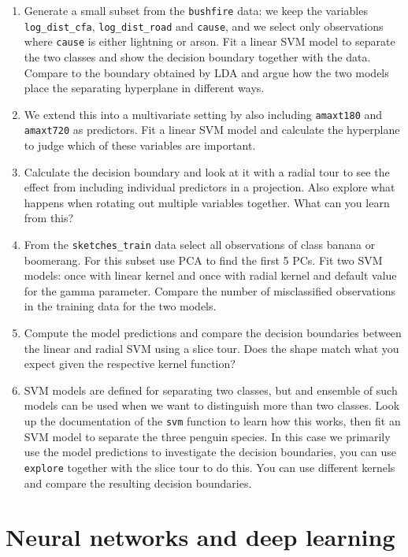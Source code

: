 \documentclass[
  letterpaper,
]{krantz}
\providecommand{\tightlist}{%
  \setlength{\itemsep}{0pt}\setlength{\parskip}{0pt}}
\begin{document}
\begin{enumerate}
\def\labelenumi{\arabic{enumi}.}
\tightlist
\item
  Generate a small subset from the \texttt{bushfire} data: we keep the
  variables \texttt{log\_dist\_cfa}, \texttt{log\_dist\_road} and
  \texttt{cause}, and we select only observations where \texttt{cause}
  is either lightning or arson. Fit a linear SVM model to separate the
  two classes and show the decision boundary together with the data.
  Compare to the boundary obtained by LDA and argue how the two models
  place the separating hyperplane in different
  ways.
\item
  We extend this into a multivariate setting by also including
  \texttt{amaxt180} and \texttt{amaxt720} as predictors. Fit a linear
  SVM model and calculate the hyperplane to judge which of these
  variables are important.
\item
  Calculate the decision boundary and look at it with a radial tour to
  see the effect from including individual predictors in a projection.
  Also explore what happens when rotating out multiple variables
  together. What can you learn from this?
\item
  From the \texttt{sketches\_train} data select all observations of
  class banana or boomerang. For this subset use PCA to find the first 5
  PCs. Fit two SVM models: once with linear kernel and once with radial
  kernel and default value for the gamma parameter. Compare the number
  of misclassified observations in the training data for the two
  models.
\item
  Compute the model predictions and compare the decision boundaries
  between the linear and radial SVM using a slice tour. Does the shape
  match what you expect given the respective kernel function?
\item
  SVM models are defined for separating two classes, but and ensemble of
  such models can be used when we want to distinguish more than two
  classes. Look up the documentation of the \texttt{svm} function to
  learn how this works, then fit an SVM model to separate the three
  penguin species. In this case we primarily use the model predictions
  to investigate the decision boundaries, you can use \texttt{explore}
  together with the slice tour to do this. You can use different kernels
  and compare the resulting decision boundaries.
\end{enumerate}

\chapter{Neural networks and deep
learning}\label{neural-networks-and-deep-learning}
\end{document}
